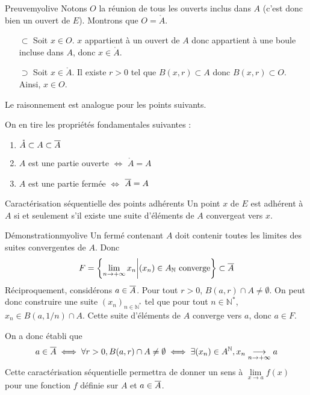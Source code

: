     \begin{demo}{Preuve}{myolive}
        Notons $O$ la réunion de tous les ouverts inclus dans $A$ (c’est donc bien un ouvert de $E$). Montrons que $O = \mathring{A}$.
        \begin{itemize}
            \item[$\subset$] Soit $x \in O$. $x$ appartient à un ouvert de $A$ donc appartient à une boule incluse dans $A$, donc $x \in \mathring{A}$.
            \item[$\supset$] Soit $x \in \mathring{A}$. Il existe $r > 0$ tel que $B(x,r) \subset A$ donc $B(x,r) \subset O$. Ainsi, $x \in O$.
        \end{itemize}
        Le raisonnement est analogue pour les points suivants.
    \end{demo}

    On en tire les propriétés fondamentales suivantes :
    \begin{enumerate}
        \item $\mathring{A} \subset A \subset \overline{A}$
        \item $A$ est une partie ouverte $\iff$ $\mathring{A} = A$
        \item $A$ est une partie fermée $\iff$ $\overline{A} = A$
    \end{enumerate}

    \begin{prop}{Caractérisation séquentielle des points adhérents}
        Un point $x$ de $E$ est adhérent à $A$ si et seulement s’il existe une suite d’éléments de $A$ convergeat vers $x$.
    \end{prop}

    \begin{demo}{Démonstration}{myolive}
        Un fermé contenant $A$ doit contenir toutes les limites des suites convergentes de $A$. Donc 
        \[ F = \left\{\lim\limits_{n \rightarrow +\infty} x_n \middle| (x_n) \in A_{\mathbb{N}} \text{ converge}\right\} \subset \overline{A} \] 
        Réciproquement, considérons $a \in \overline{A}$. Pour tout $r > 0$, $B(a,r) \cap A \neq \emptyset$. On peut donc construire une suite $(x_n)_{n \in \mathbb{N}^*}$ tel que pour tout $n \in \mathbb{N}^*$, $x_n \in B(a,1/n) \cap A$. Cette suite d’éléments de $A$ converge vers $a$, donc $a \in F$.
    \end{demo}

    On a donc établi que 
    \[ a \in \overline{A} \iff \forall r > 0, B(a,r) \cap A \neq \emptyset \iff \exists (x_n) \in A^{\mathbb{N}}, x_n \underset{n \rightarrow +\infty}{\longrightarrow} a \] 
    Cette caractérisation séquentielle permettra de donner un sens à $\lim\limits_{x \rightarrow a} f(x)$ pour une fonction $f$ définie sur $A$ et $a \in \overline{A}$.

